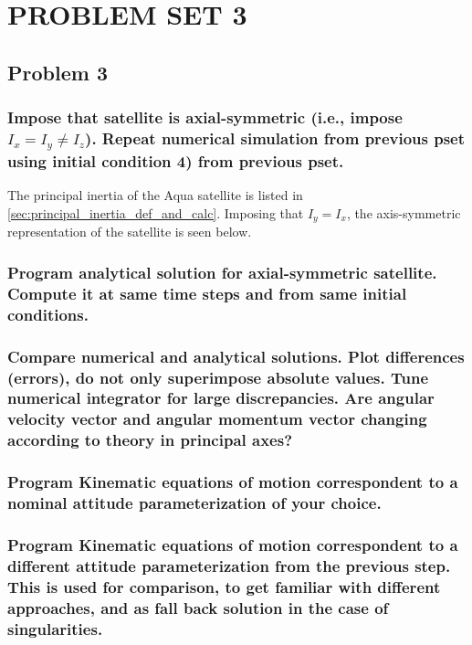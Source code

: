\section{\Large PROBLEM SET 3}
\subsection{Problem 3}

\subsubsection{Impose that satellite is axial-symmetric (i.e., impose $I_x=I_y\neq I_z$). Repeat numerical simulation from previous pset using initial condition 4) from previous pset.}

The principal inertia of the Aqua satellite is listed in \ref{sec:principal_inertia_def_and_calc}. Imposing that $I_y=I_x$, the axis-symmetric representation of the satellite is seen below.



\subsubsection{Program analytical solution for axial-symmetric satellite. Compute it at same time steps and from same initial conditions.}

\subsubsection{Compare numerical and analytical solutions. Plot differences (errors), do not only superimpose absolute values. Tune numerical integrator for large discrepancies. Are angular velocity vector and angular momentum vector changing according to theory in principal axes?}

\subsubsection{Program Kinematic equations of motion correspondent to a nominal attitude parameterization of your choice.}

\subsubsection{Program Kinematic equations of motion correspondent to a different attitude parameterization from the previous step. This is used for comparison, to get familiar with different approaches, and as fall back solution in the case of singularities.}


